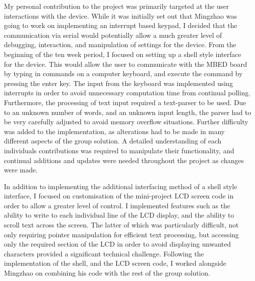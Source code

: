 My personal contribution to the project was primarily targeted at the user 
interactions with the device. While it was initially set out that Mingzhao was 
going to work on implementing an interrupt based keypad, I decided that the 
communication via serial would potentially allow a much greater level of 
debugging, interaction, and manipulation of settings for the device. From the 
beginning of the ten week period, I focused on setting up a shell style interface 
for the device. This would allow the user to communicate with the MBED board by 
typing in commands on a computer keyboard, and execute the command by pressing 
the enter key. The input from the keyboard was implemented using interrupts in 
order to avoid unnecessary computation time from continual polling. 
Furthermore, the processing of text input required a text-parser to be used. 
Due to an unknown number of words, and an unknown input length, the parser had 
to be very carefully adjusted to avoid memory overflow situations. Further 
difficulty was added to the implementation, as alterations had to be made in many 
different aspects of the group solution. A detailed understanding of each 
individuals contributions was required to manipulate their functionality, and 
continual additions and updates were needed throughout the project as changes 
were made. 
\par\bigskip\noindent
In addition to implementing the additional interfacing method of a shell style 
interface, I focused on customisation of the mini-project LCD screen code in 
order to allow a greater level of control. I implemented features such as the 
ability to write to each individual line of the LCD display, and the ability to 
scroll text across the screen. 
The latter of which was particularly difficult, not only requiring pointer 
manipulation for efficient text processing, but accessing only the required 
section of the LCD in order to avoid displaying unwanted characters provided 
a significant technical challenge. Following the implementation of the shell, and 
the LCD screen code, 
I worked alongside Mingzhao on combining his code with 
the rest of the group solution. 

